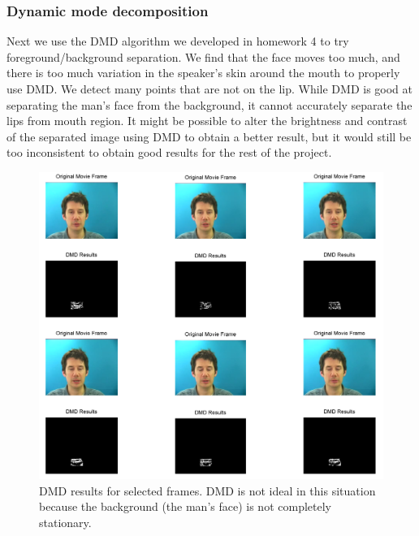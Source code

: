 \documentclass[a4paper,11pt]{article}
\begin{document}
\subsubsection{Dynamic mode decomposition}
Next we use the DMD algorithm we developed in homework 4 to try foreground/background separation. We find that the face moves too much, and there is too much variation in the speaker's skin around the mouth to properly use DMD. We detect many points that are not on the lip. While DMD is good at separating the man's face from the background, it cannot accurately separate the lips from mouth region. It might be possible to alter the brightness and contrast of the separated image using DMD to obtain a better result, but it would still be too inconsistent to obtain good results for the rest of the project. \par

\begin{figure}[!ht]
	\includegraphics[width=1\textwidth, height=0.75\textwidth]{DMD1.png}
	\caption{DMD results for selected frames. DMD is not ideal in this situation because the background (the man's face) is not completely stationary.}
\end{figure}
\end{document}
